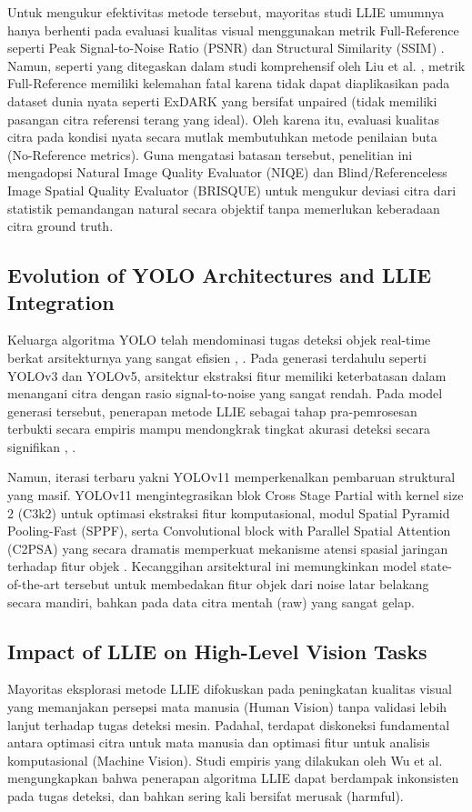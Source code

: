 \documentclass[conference]{IEEEtran}
\begin{document}
Untuk mengukur efektivitas metode tersebut, mayoritas studi LLIE umumnya hanya berhenti pada evaluasi kualitas visual menggunakan metrik Full-Reference seperti Peak Signal-to-Noise Ratio (PSNR) dan Structural Similarity (SSIM) \cite{wu2024llieeffect}. Namun, seperti yang ditegaskan dalam studi komprehensif oleh Liu et al. \cite{liu2021benchmark}, metrik Full-Reference memiliki kelemahan fatal karena tidak dapat diaplikasikan pada dataset dunia nyata seperti ExDARK yang bersifat unpaired (tidak memiliki pasangan citra referensi terang yang ideal). Oleh karena itu, evaluasi kualitas citra pada kondisi nyata secara mutlak membutuhkan metode penilaian buta (No-Reference metrics). Guna mengatasi batasan tersebut, penelitian ini mengadopsi Natural Image Quality Evaluator (NIQE) \cite{mittal2013niqe} dan Blind/Referenceless Image Spatial Quality Evaluator (BRISQUE) \cite{mittal2012brisque} untuk mengukur deviasi citra dari statistik pemandangan natural secara objektif tanpa memerlukan keberadaan citra ground truth.

\subsection{Evolution of YOLO Architectures and LLIE Integration}
Keluarga algoritma YOLO telah mendominasi tugas deteksi objek real-time berkat arsitekturnya yang sangat efisien \cite{terven2023yoloreview}, \cite{sapkota2025yoloreview}. Pada generasi terdahulu seperti YOLOv3 dan YOLOv5, arsitektur ekstraksi fitur memiliki keterbatasan dalam menangani citra dengan rasio signal-to-noise yang sangat rendah. Pada model generasi tersebut, penerapan metode LLIE sebagai tahap pra-pemrosesan terbukti secara empiris mampu mendongkrak tingkat akurasi deteksi secara signifikan \cite{shovo2024lowlight}, \cite{wang2023yolov5lowlight}.

Namun, iterasi terbaru yakni YOLOv11 memperkenalkan pembaruan struktural yang masif. YOLOv11 mengintegrasikan blok Cross Stage Partial with kernel size 2 (C3k2) untuk optimasi ekstraksi fitur komputasional, modul Spatial Pyramid Pooling-Fast (SPPF), serta Convolutional block with Parallel Spatial Attention (C2PSA) yang secara dramatis memperkuat mekanisme atensi spasial jaringan terhadap fitur objek \cite{khanam2024yolov11}. Kecanggihan arsitektural ini memungkinkan model state-of-the-art tersebut untuk membedakan fitur objek dari noise latar belakang secara mandiri, bahkan pada data citra mentah (raw) yang sangat gelap.

\subsection{Impact of LLIE on High-Level Vision Tasks}
Mayoritas eksplorasi metode LLIE difokuskan pada peningkatan kualitas visual yang memanjakan persepsi mata manusia (Human Vision) tanpa validasi lebih lanjut terhadap tugas deteksi mesin. Padahal, terdapat diskoneksi fundamental antara optimasi citra untuk mata manusia dan optimasi fitur untuk analisis komputasional (Machine Vision). Studi empiris yang dilakukan oleh Wu et al. \cite{wu2024llieeffect} mengungkapkan bahwa penerapan algoritma LLIE dapat berdampak inkonsisten pada tugas deteksi, dan bahkan sering kali bersifat merusak (harmful). 
\end{document}
